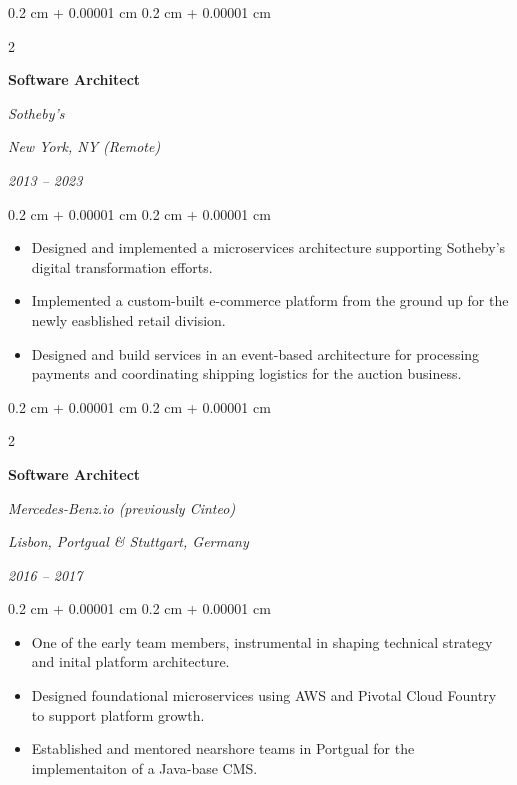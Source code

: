 \documentclass[10pt, letterpaper]{article}
\newenvironment{highlights}{
    \begin{itemize}[
        topsep=0.10 cm,
        parsep=0.10 cm,
        partopsep=0pt,
        itemsep=0pt,
        leftmargin=0.4 cm + 10pt
    ]
}{
    \end{itemize}
} %
\newenvironment{onecolentry}{
    \begin{adjustwidth}{
        0.2 cm + 0.00001 cm
    }{
        0.2 cm + 0.00001 cm
    }
}{
    \end{adjustwidth}
} %
\newenvironment{twocolentry}[2][]{
    \onecolentry
    \def\secondColumn{#2}
    \setcolumnwidth{\fill, 8 cm}
    \begin{paracol}{2}
}{
    \switchcolumn \raggedleft \secondColumn
    \end{paracol}
    \endonecolentry
} %
\begin{document}
\vspace{0.2 cm}

%
%
\begin{twocolentry}{
        \textit{New York, NY (Remote)}

        \textit{2013 – 2023}}
    \textbf{Software Architect}

    \textit{Sotheby's}
\end{twocolentry}

\vspace{0.10 cm}
\begin{onecolentry}
    \begin{highlights}
        \item Designed and implemented a microservices architecture supporting Sotheby's digital transformation efforts.
        \item Implemented a custom-built e-commerce platform from the ground up for the newly easblished retail division.
        \item Designed and build services in an event-based architecture for processing payments and coordinating shipping logistics for the auction business.
    \end{highlights}
\end{onecolentry}

\vspace{0.2 cm}

%
%
\begin{twocolentry}{
        \textit{Lisbon, Portgual \& Stuttgart, Germany}

        \textit{2016 – 2017}}
    \textbf{Software Architect}

    \textit{Mercedes-Benz.io (previously Cinteo)}
\end{twocolentry}

\vspace{0.10 cm}
\begin{onecolentry}
    \begin{highlights}
        \item One of the early team members, instrumental in shaping technical strategy and inital platform architecture.
        \item Designed foundational microservices using AWS and Pivotal Cloud Fountry to support platform growth.
        \item Established and mentored nearshore teams in Portgual for the implementaiton of a Java-base CMS.
    \end{highlights}
\end{onecolentry}
\end{document}
